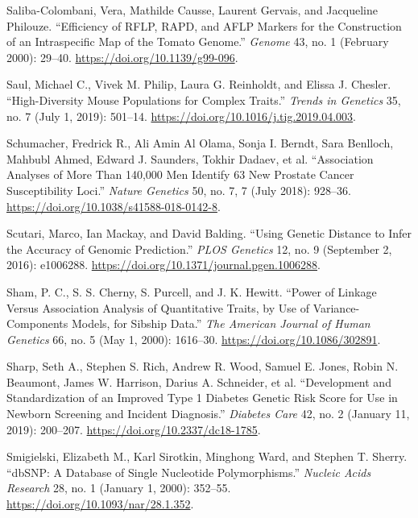 \documentclass[
  9pt,
]{book}
\newlength{\cslhangindent}
\newlength{\cslentryspacingunit} %
\newenvironment{CSLReferences}[2] %
 {%
  \setlength{\parindent}{0pt}
  \ifodd #1
  \let\oldpar\par
  \def\par{\hangindent=\cslhangindent\oldpar}
  \fi
  \setlength{\parskip}{#2\cslentryspacingunit}
 }%
 {}
\begin{document}
\begin{CSLReferences}{1}{0}
\leavevmode{}%
Saliba-Colombani, Vera, Mathilde Causse, Laurent Gervais, and Jacqueline Philouze. {``Efficiency of {RFLP}, {RAPD}, and {AFLP} Markers for the Construction of an Intraspecific Map of the Tomato Genome.''} \emph{Genome} 43, no. 1 (February 2000): 29--40. \url{https://doi.org/10.1139/g99-096}.

\leavevmode{}%
Saul, Michael C., Vivek M. Philip, Laura G. Reinholdt, and Elissa J. Chesler. {``High-{Diversity Mouse Populations} for {Complex Traits}.''} \emph{Trends in Genetics} 35, no. 7 (July 1, 2019): 501--14. \url{https://doi.org/10.1016/j.tig.2019.04.003}.

\leavevmode{}%
Schumacher, Fredrick R., Ali Amin Al Olama, Sonja I. Berndt, Sara Benlloch, Mahbubl Ahmed, Edward J. Saunders, Tokhir Dadaev, et al. {``Association Analyses of More Than 140,000 Men Identify 63 New Prostate Cancer Susceptibility Loci.''} \emph{Nature Genetics} 50, no. 7, 7 (July 2018): 928--36. \url{https://doi.org/10.1038/s41588-018-0142-8}.

\leavevmode{}%
Scutari, Marco, Ian Mackay, and David Balding. {``Using {Genetic Distance} to {Infer} the {Accuracy} of {Genomic Prediction}.''} \emph{PLOS Genetics} 12, no. 9 (September 2, 2016): e1006288. \url{https://doi.org/10.1371/journal.pgen.1006288}.

\leavevmode{}%
Sham, P. C., S. S. Cherny, S. Purcell, and J. K. Hewitt. {``Power of {Linkage} Versus {Association Analysis} of {Quantitative Traits}, by {Use} of {Variance-Components Models}, for {Sibship Data}.''} \emph{The American Journal of Human Genetics} 66, no. 5 (May 1, 2000): 1616--30. \url{https://doi.org/10.1086/302891}.

\leavevmode{}%
Sharp, Seth A., Stephen S. Rich, Andrew R. Wood, Samuel E. Jones, Robin N. Beaumont, James W. Harrison, Darius A. Schneider, et al. {``Development and {Standardization} of an {Improved Type} 1 {Diabetes Genetic Risk Score} for {Use} in {Newborn Screening} and {Incident Diagnosis}.''} \emph{Diabetes Care} 42, no. 2 (January 11, 2019): 200--207. \url{https://doi.org/10.2337/dc18-1785}.

\leavevmode{}%
Smigielski, Elizabeth M., Karl Sirotkin, Minghong Ward, and Stephen T. Sherry. {``{dbSNP}: A Database of Single Nucleotide Polymorphisms.''} \emph{Nucleic Acids Research} 28, no. 1 (January 1, 2000): 352--55. \url{https://doi.org/10.1093/nar/28.1.352}.


\end{CSLReferences}
\end{document}
